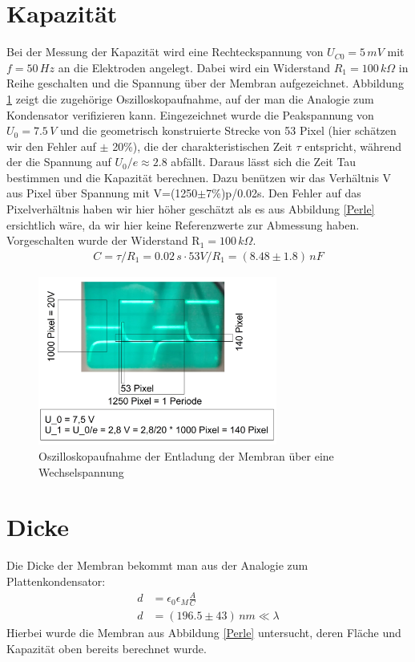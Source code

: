 \documentclass{include/thesisclass3}
\newcommand{\e}[1]{\,\si{#1}}
\begin{document}
\section{Kapazität}
Bei der Messung der Kapazität wird eine Rechteckspannung von $U_{C0}=5\e{mV}$ mit $f=50\e{Hz}$ an die Elektroden angelegt. Dabei wird ein Widerstand $R_1=100\e{k\Omega}$ in Reihe geschalten und die Spannung über der Membran aufgezeichnet. Abbildung \ref{oszi} zeigt die zugehörige Oszilloskopaufnahme, auf der man die Analogie zum Kondensator verifizieren kann. Eingezeichnet wurde die Peakspannung von $U_0 = 7.5\e{V}$ und die geometrisch konstruierte Strecke von 53 Pixel (hier schätzen wir den Fehler auf $\pm$ 20\%), die der charakteristischen Zeit $\tau$ entspricht, während der die Spannung auf $U_0/\textit{e}\approx 2.8$ abfällt. Daraus lässt sich die Zeit Tau bestimmen und die Kapazität berechnen. Dazu benützen wir das Verhältnis V aus Pixel über Spannung mit V=(1250$\pm$7\%)p/0.02s. Den Fehler auf das Pixelverhältnis haben wir hier höher geschätzt als es aus Abbildung \ref{Perle} ersichtlich wäre, da wir hier keine Referenzwerte zur Abmessung haben. Vorgeschalten wurde der Widerstand R$_1=100\e{k\Omega}$.
\begin{align}
C=\tau/ R_1 = 0.02\e{s}\cdot 53 V/R_1 = (8.48 \pm 1.8)\e{nF}
\end{align}
\begin{figure}[ht]
	\begin{center}
		\includegraphics[width=0.7\textwidth]{images/measure.png}
		\caption{Oszilloskopaufnahme der Entladung der Membran über eine Wechselspannung}
		\label{oszi}
	\end{center}
\end{figure}

\section{Dicke}
Die Dicke der Membran bekommt man aus der Analogie zum Plattenkondensator:
\begin{align*}
	d&=\epsilon_0\epsilon_M \frac{A}{C}\\
	d&=(196.5 \pm 43)\e{nm} \ll \lambda
\end{align*}
Hierbei wurde die Membran aus Abbildung \ref{Perle} untersucht, deren Fläche und Kapazität oben bereits berechnet wurde. 
\end{document}
